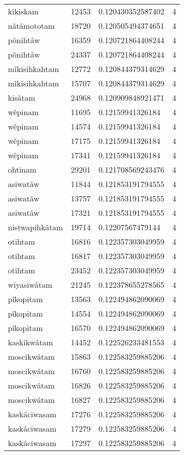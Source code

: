 \begin{longtable}{llll}
kikiskam & 12453 & 0.120430352587402 & 4 \\
nâtâmototam & 18720 & 0.120505494374651 & 4 \\
pônihtâw & 16359 & 0.120721864408244 & 4 \\
pônihtâw & 24337 & 0.120721864408244 & 4 \\
mîkisihkahtam & 12772 & 0.120844379314629 & 4 \\
mîkisihkahtam & 15707 & 0.120844379314629 & 4 \\
kisâtam & 24968 & 0.120909848921471 & 4 \\
wêpinam & 11695 & 0.12159941326184 & 4 \\
wêpinam & 14574 & 0.12159941326184 & 4 \\
wêpinam & 17175 & 0.12159941326184 & 4 \\
wêpinam & 17341 & 0.12159941326184 & 4 \\
ohtinam & 29201 & 0.121708569243476 & 4 \\
asiwatâw & 11844 & 0.121853191794555 & 4 \\
asiwatâw & 13757 & 0.121853191794555 & 4 \\
asiwatâw & 17321 & 0.121853191794555 & 4 \\
nistwapihkâtam & 19714 & 0.12207567479144 & 4 \\
otihtam & 16816 & 0.122357303049959 & 4 \\
otihtam & 16817 & 0.122357303049959 & 4 \\
otihtam & 23452 & 0.122357303049959 & 4 \\
wiyasiwâtam & 21245 & 0.122378655278565 & 4 \\
pîkopitam & 13563 & 0.122494862090069 & 4 \\
pîkopitam & 14554 & 0.122494862090069 & 4 \\
pîkopitam & 16570 & 0.122494862090069 & 4 \\
kaskikwâtam & 14452 & 0.122526233481553 & 4 \\
moscikwâtam & 15863 & 0.122583259885206 & 4 \\
moscikwâtam & 16760 & 0.122583259885206 & 4 \\
moscikwâtam & 16826 & 0.122583259885206 & 4 \\
moscikwâtam & 16827 & 0.122583259885206 & 4 \\
kaskâciwasam & 17276 & 0.122583259885206 & 4 \\
kaskâciwasam & 17279 & 0.122583259885206 & 4 \\
kaskâciwasam & 17297 & 0.122583259885206 & 4 \\

\end{longtable}
